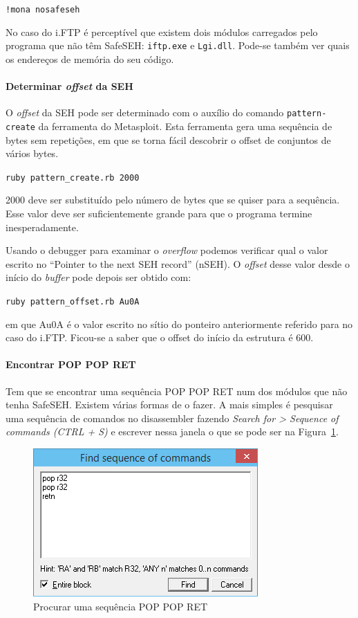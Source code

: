 \documentclass[a4paper]{article}
\begin{document}
	\texttt{!mona nosafeseh}

No caso do i.FTP é perceptível que existem dois módulos carregados pelo programa que não têm SafeSEH: \texttt{iftp.exe} e \texttt{Lgi.dll}. Pode-se também ver quais os endereços de memória do seu código.

\paragraph*{Determinar \textit{offset} da SEH} O \textit{offset} da SEH pode ser determinado com o auxílio do comando \texttt{pattern-create} da ferramenta do Metasploit. Esta ferramenta gera uma sequência de bytes sem repetições, em que se torna fácil descobrir o offset de conjuntos de vários bytes.

	\texttt{ruby pattern\_create.rb 2000}

2000 deve ser substituído pelo número de bytes que se quiser para a sequência. Esse valor deve ser suficientemente grande para que o programa termine inesperadamente.

Usando o debugger para examinar o \textit{overflow} podemos verificar qual o valor escrito no ``Pointer to the next SEH record'' (nSEH). O \textit{offset} desse valor desde o início do \textit{buffer} pode depois ser obtido com:

	\texttt{ruby pattern\_offset.rb Au0A}

em que Au0A é o valor escrito no sítio do ponteiro anteriormente referido para no caso do i.FTP. Ficou-se a saber que o offset do início da estrutura é 600.

\paragraph*{Encontrar POP POP RET} Tem que se encontrar uma sequência POP POP RET num dos módulos que não tenha SafeSEH. Existem várias formas de o fazer. A mais simples é pesquisar uma sequência de comandos no disassembler fazendo \textit{Search for > Sequence of commands (CTRL + S)} e escrever nessa janela o que se pode ser na Figura~\ref{find_POPPOPRET}.

\begin{figure}
	\centering
	\includegraphics[scale=1]{find_POPPOPRET}
	\caption{Procurar uma sequência POP POP RET}
	\label{find_POPPOPRET}
\end{figure}
\end{document}
